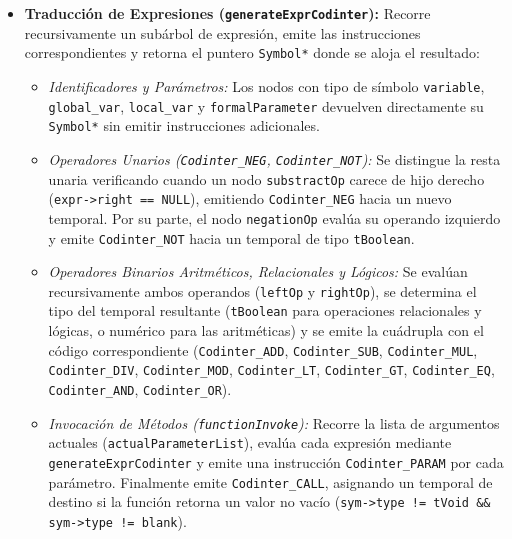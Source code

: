 \documentclass[12pt, a4paper]{article}
\begin{document}
\begin{itemize}
    \item \textbf{Traducción de Expresiones (\texttt{generateExprCodinter}):} Recorre recursivamente un subárbol de expresión, emite las instrucciones correspondientes y retorna el puntero \texttt{Symbol*} donde se aloja el resultado:
    \begin{itemize}
        \item \textit{Identificadores y Parámetros:} Los nodos con tipo de símbolo \texttt{variable}, \texttt{global\_var}, \texttt{local\_var} y \texttt{formalParameter} devuelven directamente su \texttt{Symbol*} sin emitir instrucciones adicionales.
        \item \textit{Operadores Unarios (\texttt{Codinter\_NEG}, \texttt{Codinter\_NOT}):} Se distingue la resta unaria verificando cuando un nodo \texttt{substractOp} carece de hijo derecho (\texttt{expr->right == NULL}), emitiendo \texttt{Codinter\_NEG} hacia un nuevo temporal. Por su parte, el nodo \texttt{negationOp} evalúa su operando izquierdo y emite \texttt{Codinter\_NOT} hacia un temporal de tipo \texttt{tBoolean}.
        \item \textit{Operadores Binarios Aritméticos, Relacionales y Lógicos:} Se evalúan recursivamente ambos operandos (\texttt{leftOp} y \texttt{rightOp}), se determina el tipo del temporal resultante (\texttt{tBoolean} para operaciones relacionales y lógicas, o numérico para las aritméticas) y se emite la cuádrupla con el código correspondiente (\texttt{Codinter\_ADD}, \texttt{Codinter\_SUB}, \texttt{Codinter\_MUL}, \texttt{Codinter\_DIV}, \texttt{Codinter\_MOD}, \texttt{Codinter\_LT}, \texttt{Codinter\_GT}, \texttt{Codinter\_EQ}, \texttt{Codinter\_AND}, \texttt{Codinter\_OR}).
        \item \textit{Invocación de Métodos (\texttt{functionInvoke}):} Recorre la lista de argumentos actuales (\texttt{actualParameterList}), evalúa cada expresión mediante \texttt{generateExprCodinter} y emite una instrucción \texttt{Codinter\_PARAM} por cada parámetro. Finalmente emite \texttt{Codinter\_CALL}, asignando un temporal de destino si la función retorna un valor no vacío (\texttt{sym->type != tVoid \&\& sym->type != blank}).
    \end{itemize}


\end{itemize}
\end{document}
